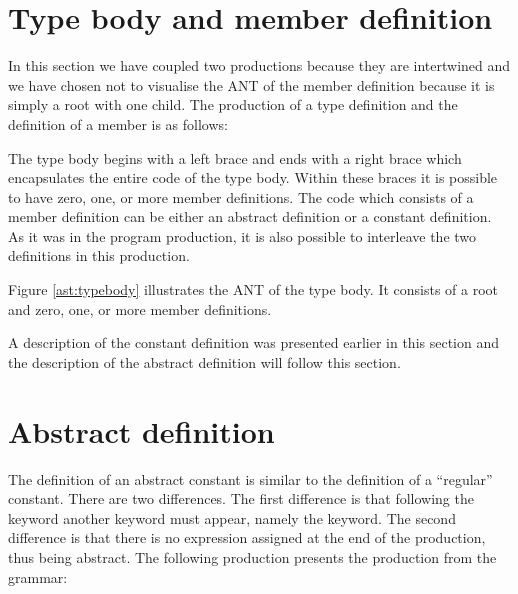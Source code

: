 \section{Type body and member definition}

In this section we have coupled two productions because they are intertwined
and we have chosen not to visualise the ANT of the member definition because it
is simply a root with one child. The production of a type definition and the
definition of a member is as follows:

\begin{ebnf}
\end{ebnf}

The type body begins with a left brace and ends with a right brace which
encapsulates the entire code of the type body. Within these braces it is
possible to have zero, one, or more member definitions. The code which consists
of a member definition can be either an abstract definition or a constant
definition. As it was in the program production, it is also possible to
interleave the two definitions in this production.



Figure \ref{ast:typebody} illustrates the ANT of the type body. It consists of a
root and zero, one, or more member definitions.

A description of the constant definition was presented earlier in this section
and the description of the abstract definition will follow this section.

\section{Abstract definition}
The definition of an abstract constant is similar to the definition of a
``regular'' constant. There are two differences. The first difference is that
following the  keyword another keyword must appear, namely the
 keyword. The second difference is that there is no expression
assigned at the end of the production, thus being abstract. The following
production presents the production from the grammar:

\begin{ebnf}
\end{ebnf}

